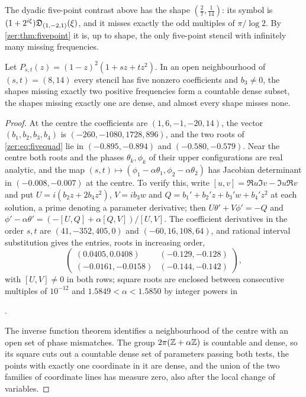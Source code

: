 The dyadic five-point contrast above has the shape $(\tfrac27,\tfrac1{14})$: its symbol is
$(1+2^{i\xi})\mathfrak{D}_{(1,-2,1)}(\xi)$, and it misses exactly the odd multiples of $\pi/\log2$. By
\cref{zer:thm:fivepoint} it is, up to shape, the only five-point stencil with infinitely many missing
frequencies.

\begin{theorem}\label{zer:thm:fivetwo}
Let $P_{s,t}(z)=(1-z)^2(1+sz+tz^2)$. In an open neighbourhood of $(s,t)=(8,14)$ every stencil has five nonzero
coefficients and $b_3\ne0$, the shapes missing exactly two positive frequencies form a countable dense subset,
the shapes missing exactly one are dense, and almost every shape misses none.
\end{theorem}
\begin{proof}
At the centre the coefficients are $(1,6,-1,-20,14)$, the vector $(b_1,b_2,b_3,b_4)$ is
$(-260,-1080,1728,896)$, and the two
roots of \eqref{zer:eq:fivequad} lie in $(-0.895,-0.894)$ and $(-0.580,-0.579)$. Near the centre both roots and
the phases $\theta_k,\phi_k$ of their upper configurations are real analytic, and the map
$(s,t)\mapsto(\phi_1-\alpha\theta_1,\phi_2-\alpha\theta_2)$ has Jacobian determinant in $(-0.008,-0.007)$ at the
centre. To verify this, write $[u,v]=\Re u\Im v-\Im u\Re v$ and put $U=i(b_2z+2b_4z^2)$, $V=ib_3w$ and
$Q=b_1'+b_2'z+b_3'w+b_4'z^2$ at each solution, a prime denoting a parameter derivative; then
$U\theta'+V\phi'=-Q$ and $\phi'-\alpha\theta'=(-[U,Q]+\alpha[Q,V])/[U,V]$. The coefficient derivatives in the order
$s,t$ are $(41,-352,405,0)$ and $(-60,16,108,64)$, and rational interval substitution gives the entries, roots
in increasing order,
\[
 \begin{pmatrix}(0.0405,0.0408)&(-0.129,-0.128)\\(-0.0161,-0.0158)&(-0.144,-0.142)\end{pmatrix},
\]
with $[U,V]\ne0$ in both rows; square roots are enclosed between consecutive multiples of $10^{-12}$ and
$1.5849<\alpha<1.5850$ by integer powers in
\begin{center}{\small{}}.\end{center}
The inverse
function theorem identifies a neighbourhood of the centre with an open set of phase mismatches. The group
$2\pi(\mathbb{Z}+\alpha\mathbb{Z})$ is countable and dense, so its square cuts out a countable dense set of parameters
passing both tests, the points with exactly one coordinate in it are dense, and the union of the two
families of coordinate lines has measure zero, also after the local change of variables.
\end{proof}

